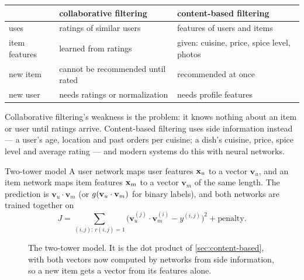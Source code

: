 \begin{center}
\small
\renewcommand{\arraystretch}{1.3}
\begin{tabular}{@{}L{2.6cm}L{4.2cm}L{4.2cm}@{}}
\toprule
 & collaborative filtering & content-based filtering\\
\midrule
uses & ratings of similar users & features of users and items\\
item features & learned from ratings & given: cuisine, price, spice level, photos\\
new item & cannot be recommended until rated & recommended at once\\
new user & needs ratings or normalization & needs profile features\\
\bottomrule
\end{tabular}
\end{center}

Collaborative filtering's weakness is the  problem: it knows
nothing about an item or user until ratings arrive. Content-based filtering uses
side information instead --- a user's age, location and past orders per cuisine;
a dish's cuisine, price, spice level and average rating --- and modern systems do
this with neural networks.

\begin{defbox}{Two-tower model}
A user network maps user features $\mathbf{x}_u$ to a vector $\mathbf{v}_u$, and an item
network maps item features $\mathbf{x}_m$ to a vector $\mathbf{v}_m$ of the same length.
The prediction is $\mathbf{v}_u\cdot\mathbf{v}_m$ (or $g(\mathbf{v}_u\cdot
\mathbf{v}_m)$ for binary labels), and both networks are trained together on
\[
  J = \!\!\sum_{(i,j):\,r(i,j)=1}\!\!\bigl(\mathbf{v}_u^{(j)}\cdot\mathbf{v}_m^{(i)} - y^{(i,j)}\bigr)^2
    + \text{penalty} .
\]
\end{defbox}

\begin{figure}[htbp]
  \centering
  \caption{The two-tower model. It is the dot product of
  \cref{sec:content-based}, with both vectors now computed by networks from side
  information, so a new item gets a vector from its features alone.}
  \label{fig:two-tower}
\end{figure}

